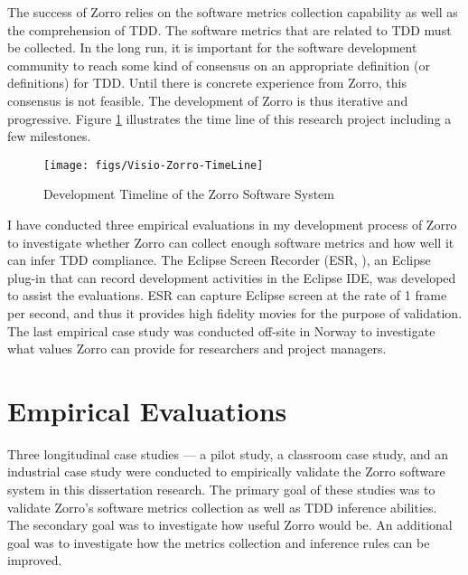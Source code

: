 The success of Zorro relies on the software metrics collection capability as well as the comprehension of TDD. The software metrics that are related to TDD must be collected. In the long run, it is important for the software development community to reach some kind of consensus on an appropriate definition (or definitions) for TDD. Until there is concrete experience from Zorro, this consensus is not feasible. The development of Zorro is thus iterative and progressive. Figure \ref{fig:Zorro-Timeline} illustrates the time line of this research project including a few milestones. 
\begin{figure}[htbp]
  \centering
  \texttt{[image: figs/Visio-Zorro-TimeLine]}
  \caption{Development Timeline of the Zorro Software System}
  \label{fig:Zorro-Timeline}
\end{figure}
I have conducted three empirical evaluations in my development process of Zorro to investigate whether Zorro can collect enough software metrics and how well it can infer TDD compliance. The Eclipse Screen Recorder (ESR, \cite{esr}), an Eclipse plug-in that can record development activities in the Eclipse IDE, was developed to assist the evaluations. ESR can capture Eclipse screen at the rate of 1 frame per second, and thus it provides high fidelity movies for the purpose of validation. The last empirical case study was conducted off-site in Norway to investigate what values Zorro can provide for researchers and project managers. 

\section{Empirical Evaluations}
\label{sec:introduction-evaluation}
Three longitudinal case studies --- a pilot study, a classroom case study, and an industrial case study were conducted to empirically validate the Zorro software system in this dissertation research. The primary goal of these studies was to validate Zorro's software metrics collection as well as TDD inference abilities. The secondary goal was to investigate how useful Zorro would be. An additional goal was to investigate how the metrics collection and inference rules can be improved. 

\begin{comment}
The software development processes in both studies were instrumented by the Eclipse Screen Recorder (ESR) \cite{esr}, an Eclipse plug-in that can record the software development process in the Eclipse IDE. The videos recorded by ESR were analyzed to validate Zorro's data collection and TDD inference. 

The goal of the first two studies was to evaluate and improve Zorro's software metrics collection and TDD inference capability in academic settings. 

tune the sensor and inference rules. The industrial case study was an attempt to deploy Zorro in the real TDD development situations. The primary goal was to explore how Zorro can assist project managers and researchers gaining insights of TDD.
\end{comment}

